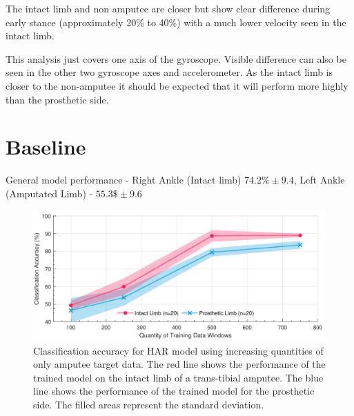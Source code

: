 The intact limb and non amputee are closer but show clear difference during early stance (approximately 20\% to 40\%) with a much lower velocity seen in the intact limb.

This analysis just covers one axis of the gyroscope. Visible difference can also be seen in the other two gyroscope axes and accelerometer. As the intact limb is closer to the non-amputee it should be expected that it will perform more highly than the prosthetic side.

\section{Baseline}
\label{sec:amputee-baseline}
General model performance - Right Ankle (Intact limb) $74.2\%\pm9.4$, Left Ankle (Amputated Limb) - $55.3\$\pm9.6$ 

\begin{figure}[hbt]
    \centering
    \includegraphics[width=\textwidth]{content/6-Amputee/ch6_baseline_model_accuracy.pdf}
    \caption[Classification accuracy for HAR model using increasing quantities of only amputee target data]{Classification accuracy for HAR model using increasing quantities of only amputee target data. The red line shows the performance of the trained model on the intact limb of a trans-tibial amputee. The blue line shows the performance of the trained model for the prosthetic side. The filled areas represent the standard deviation.}
    \label{fig:ch6-amputee-baseline-bespoke-model}
\end{figure}



